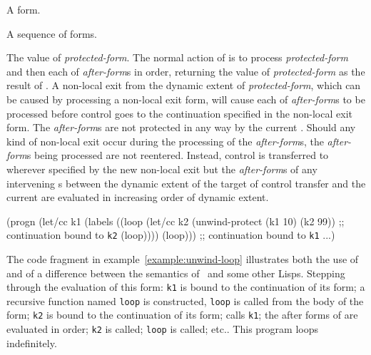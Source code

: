 \begin{optDefinition}
%
\Syntax
{}%
%
\begin{arguments}
    \item[\scdef{protected-form}] A form.
    \item[\scseqref{after-form}] A sequence of forms.
\end{arguments}
%
\result%
The value of {\em protected-form}.
%
\remarks%
The normal action of  is to process {\em
    protected-form} and then each of {\em after-form}s in order, returning the
value of {\em protected-form} as the result of .  A
non-local exit from the dynamic extent of {\em protected-form}, which can be
caused by processing a non-local exit form, will cause each of {\em after-form}s
to be processed before control goes to the continuation specified in the
non-local exit form.  The {\em after-form}s are not protected in any way by the
current .  Should any kind of non-local exit occur
during the processing of the {\em after-form}s, the {\em after-form}s being
processed are not reentered.  Instead, control is transferred to wherever
specified by the new non-local exit but the {\em after-form}s of any intervening
s between the dynamic extent of the target of control
transfer and the current  are evaluated in increasing
order of dynamic extent.
%
\examples
%
\begin{example}
\label{example:unwind-loop}
{\syntax
(progn
  (let/cc k1
    (labels
      ((loop
         (let/cc k2 (unwind-protect (k1 10) (k2 99))
         ;; continuation bound to {\tt k2}
         (loop))))
      (loop)))
  ;; continuation bound to {\tt k1}
  ...)
\endsyntax}
\end{example}
%
The code fragment in example~\ref{example:unwind-loop} illustrates both the use
of  and of a difference between the semantics of
\eulisp\ and some other Lisps.  Stepping through the evaluation of this form:
{\tt k1} is bound to the continuation of its  form; a
recursive function named {\tt loop} is constructed, {\tt loop} is called from
the body of the  form; {\tt k2} is bound to the continuation
of its  form;  calls {\tt k1}; the
after forms of  are evaluated in order; {\tt k2} is
called; {\tt loop} is called; etc..  This program loops indefinitely.
%
\end{optDefinition}

